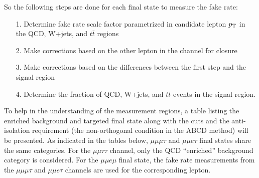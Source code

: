 




So the following steps are done for each final state to measure the fake rate:
\begin{enumerate}
\item[1.] Determine fake rate scale factor parametrized in candidate lepton $p_{\mathrm{T}}$ in the QCD, W+jets, and $t\bar{t}$ regions
\item[2.] Make corrections based on the other lepton in the channel for closure 
\item[3.] Make corrections based on the differences between the first step and the signal region
\item[4.] Determine the fraction of QCD, W+jets, and $t\bar{t}$ events in the signal region.
\end{enumerate} 

To help in the understanding of the measurement regions, a table listing the enriched background and targeted final state along with the cuts and the anti-isolation requirement (the non-orthogonal condition in the ABCD method) will be presented. 
As indicated in the tables below, $\mu\mu\mu\tau$ and $\mu\mu e \tau$ final states share the same categories. For the $\mu\mu\tau\tau$ channel, only the QCD ``enriched'' background category is considered. 
For the $\mu\mu e\mu$ final state, the fake rate measurements from the $\mu\mu\mu\tau$ and $\mu\mu e \tau$ channels are used for the corresponding lepton. 



